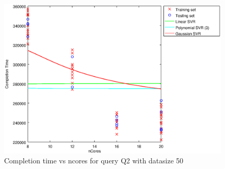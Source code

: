 
\begin {figure}[hbtp]
\centering
\includegraphics[width=\textwidth]{output/Q2_50_ALL_WITH_1_OVER_NCORES/plot_Q2_50_bestmodels.eps}
\caption{Completion time vs ncores for query Q2 with datasize 50}
\label{fig:all_linear_Q2_50}
\end {figure}

